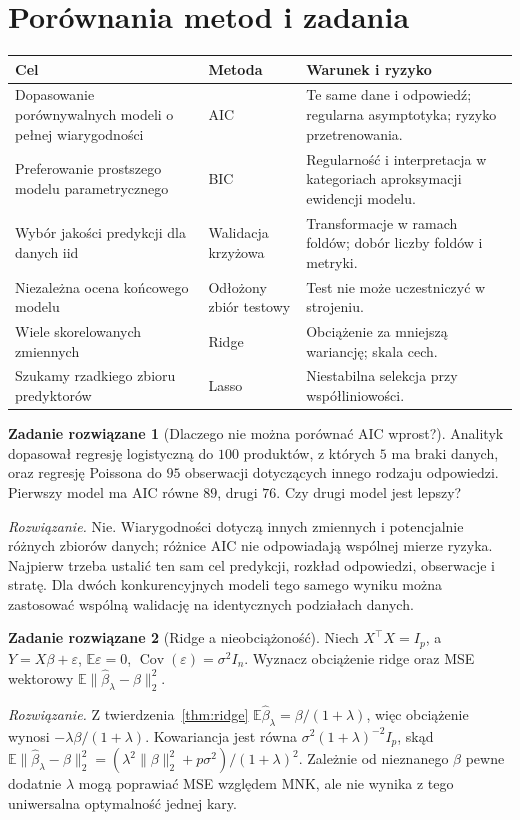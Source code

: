 \documentclass[11pt,a4paper,oneside]{report}
\numberwithin{equation}{chapter}
\theoremstyle{plain}
\theoremstyle{definition}
\newtheorem{zadanie}{Zadanie rozwiązane}[chapter]
\theoremstyle{remark}
\newcommand{\E}{\mathbb E}
\newcommand{\Cov}{\operatorname{Cov}}
\begin{document}
\section{Porównania metod i zadania}
\begin{center}\small
\begin{tabular}{>{\raggedright\arraybackslash}p{}>{\raggedright\arraybackslash}p{}>{\raggedright\arraybackslash}p{}}
\toprule
\textbf{Cel} & \textbf{Metoda} & \textbf{Warunek i ryzyko}\\
\midrule
Dopasowanie porównywalnych modeli o pełnej wiarygodności & AIC & Te same dane i odpowiedź; regularna asymptotyka; ryzyko przetrenowania.\\
Preferowanie prostszego modelu parametrycznego & BIC & Regularność i interpretacja w kategoriach aproksymacji ewidencji modelu.\\
Wybór jakości predykcji dla danych iid & Walidacja krzyżowa & Transformacje w ramach foldów; dobór liczby foldów i metryki.\\
Niezależna ocena końcowego modelu & Odłożony zbiór testowy & Test nie może uczestniczyć w strojeniu.\\
Wiele skorelowanych zmiennych & Ridge & Obciążenie za mniejszą wariancję; skala cech.\\
Szukamy rzadkiego zbioru predyktorów & Lasso & Niestabilna selekcja przy współliniowości.\\
\bottomrule
\end{tabular}
\end{center}

\begin{zadanie}[Dlaczego nie można porównać AIC wprost?]
Analityk dopasował regresję logistyczną do $100$ produktów,
z których $5$ ma braki danych, oraz regresję Poissona do
$95$ obserwacji dotyczących innego rodzaju odpowiedzi.
Pierwszy model ma AIC równe $89$, drugi $76$. Czy drugi
model jest lepszy?
\par\emph{Rozwiązanie.} Nie. Wiarygodności dotyczą innych
zmiennych i potencjalnie różnych zbiorów danych;
różnice AIC nie odpowiadają wspólnej mierze ryzyka.
Najpierw trzeba ustalić ten sam cel predykcji, rozkład
odpowiedzi, obserwacje i stratę. Dla dwóch konkurencyjnych
modeli tego samego wyniku można zastosować wspólną
walidację na identycznych podziałach danych.
\end{zadanie}

\begin{zadanie}[Ridge a nieobciążoność]
Niech $X^\top X=I_p$, a $Y=X\beta+\varepsilon$,
$\E\varepsilon=0$, $\Cov(\varepsilon)=\sigma^2I_n$.
Wyznacz obciążenie ridge oraz MSE wektorowy
$\E\|\widehat\beta_\lambda-\beta\|_2^2$.
\par\emph{Rozwiązanie.} Z twierdzenia~\ref{thm:ridge}
$\E\widehat\beta_\lambda=\beta/(1+\lambda)$,
więc obciążenie wynosi $-\lambda\beta/(1+\lambda)$.
Kowariancja jest równa
$\sigma^2(1+\lambda)^{-2}I_p$, skąd
$\E\|\widehat\beta_\lambda-\beta\|_2^2
=(\lambda^2\|\beta\|_2^2+p\sigma^2)/(1+\lambda)^2$.
Zależnie od nieznanego $\beta$ pewne dodatnie
$\lambda$ mogą poprawiać MSE względem MNK, ale nie
wynika z tego uniwersalna optymalność jednej kary.
\end{zadanie}
\end{document}

